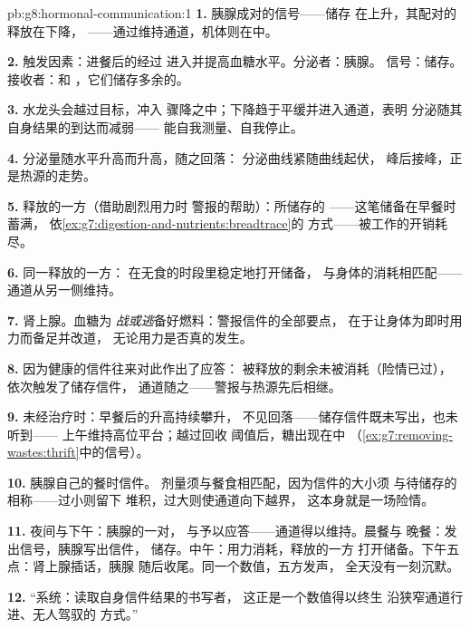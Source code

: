 \begin{solution}{pb:g8:hormonal-communication:1}
\textbf{1.} 胰腺成对的信号——储存
在上升，其配对的释放在下降，
——通过维持通道，机体则在中。

\textbf{2.} 触发因素：进餐后的经过
进入并提高血糖水平。分泌者：胰腺。
信号：储存。接收者：和
，它们储存多余的。

\textbf{3.} 水龙头会越过目标，冲入
骤降之中；下降趋于平缓并进入通道，表明
分泌随其自身结果的到达而减弱——
能自我测量、自我停止。

\textbf{4.} 分泌量随水平升高而升高，随之回落：
分泌曲线紧随曲线起伏，
峰后接峰，正是热源的走势。

\textbf{5.} 释放的一方（借助剧烈用力时
警报的帮助）：所储存的
——这笔储备在早餐时蓄满，
依\cref{ex:g7:digestion-and-nutrients:breadtrace}的
方式——被工作的开销耗尽。

\textbf{6.} 同一释放的一方：
在无食的时段里稳定地打开储备，
与身体的消耗相匹配——
通道从另一侧维持。

\textbf{7.} 肾上腺。血糖为
\emph{战或逃}备好燃料：警报信件的全部要点，
在于让身体为即时用力而备足并改道，
无论用力是否真的发生。

\textbf{8.} 因为健康的信件往来对此作出了应答：
被释放的剩余未被消耗（险情已过），
依次触发了储存信件，
通道随之——警报与热源先后相继。

\textbf{9.} 未经治疗时：早餐后的升高持续攀升，
不见回落——储存信件既未写出，也未听到——
上午维持高位平台；越过回收
阈值后，糖出现在中
（\cref{ex:g7:removing-wastes:thrift}中的信号）。

\textbf{10.} 胰腺自己的餐时信件。
剂量须与餐食相匹配，因为信件的大小须
与待储存的相称——过小则留下
堆积，过大则使通道向下越界，
这本身就是一场险情。

\textbf{11.} 夜间与下午：胰腺的一对，
与予以应答——通道得以维持。晨餐与
晚餐：发出信号，胰腺写出信件，
储存。中午：用力消耗，释放的一方
打开储备。下午五点：肾上腺插话，胰腺
随后收尾。同一个数值，五方发声，
全天没有一刻沉默。

\textbf{12.} “系统：读取自身信件结果的书写者，
这正是一个数值得以终生
沿狭窄通道行进、无人驾驭的
方式。”
\end{solution}
